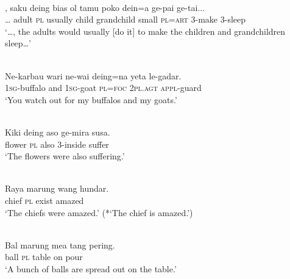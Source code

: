 \ea%
\label{ex:9:3}
 \\
\gll  {\dots}, saku deing bias ol tamu poko dein=a ge-pai ge-tai...\\
  {\dots} adult \textsc{pl} usually child grandchild small \textsc{pl=art} \textsc{3-}make 3-sleep\\
\glt `{\dots}, the adults would usually [do it] to make the children and grandchildren sleep{\dots}'
\z








\ea%
\label{ex:9:4}
 \\
\gll Ne-karbau wari ne-wai deing=na yeta le-gadar.{\upshapefootnotemark}\\
  \textsc{1sg}\textsc{-}buffalo and \textsc{1sg-}goat \textsc{pl}=\textsc{foc} \textsc{2pl.agt} \textsc{appl-}guard\\
\glt `You watch out for my buffalos and my goats.' 
\z







\ea%
\label{ex:9:5}
 \\
\gll Kiki deing aso ge-mira susa. \\
  flower \textsc{pl} also 3-inside suffer  \\
\glt `The flowers were also suffering.'
 \z








\ea%
\label{ex:9:6}
 \\
\gll  Raya marung wang hundar. \\
   chief \textsc{pl} exist amazed  \\
\glt `The chiefs were amazed.' (*`The chief is amazed.')
\z







\ea%
\label{ex:9:7}
 \\
\gll Bal  marung mea tang pering.  \\
  ball \textsc{pl} table on pour   \\
\glt `A bunch of balls are spread out on the table.'
\z


